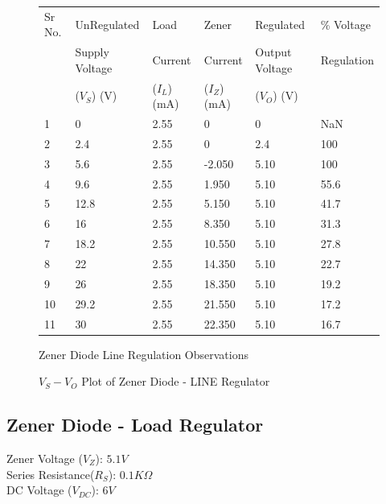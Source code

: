 			\begin{figure}[h!]
				\begin{longtable}[]{@{}llllll@{}}
					\toprule
					Sr No. & UnRegulated & Load & Zener & Regulated & \% Voltage\tabularnewline
					& Supply Voltage & Current & Current & Output Voltage & Regulation\tabularnewline
					& ($V_S$) (V) & ($I_L$) (mA) & ($I_Z$)(mA) & ($V_O$) (V) & \tabularnewline
					\midrule
					\endhead
					1 & 0 & 2.55 & 0 & 0 & NaN\tabularnewline
					2 & 2.4 & 2.55 & 0 & 2.4 & 100\tabularnewline
					3 & 5.6 & 2.55 & -2.050 & 5.10 & 100\tabularnewline
					4 & 9.6 & 2.55 & 1.950 & 5.10 & 55.6\tabularnewline
					5 & 12.8 & 2.55 & 5.150 & 5.10 & 41.7\tabularnewline
					6 & 16 & 2.55 & 8.350 & 5.10 & 31.3\tabularnewline
					7 & 18.2 & 2.55 & 10.550 & 5.10 & 27.8\tabularnewline
					8 & 22 & 2.55 & 14.350 & 5.10 & 22.7\tabularnewline
					9 & 26 & 2.55 & 18.350 & 5.10 & 19.2\tabularnewline
					10 & 29.2 & 2.55 & 21.550 & 5.10 & 17.2\tabularnewline
					11 & 30 & 2.55 & 22.350 & 5.10 & 16.7\tabularnewline
					\bottomrule
				\end{longtable}
				\caption{Zener Diode Line Regulation Observations}
			\end{figure}
			
			\begin{figure}[h]
				\centering
				\caption{$V_S - V_O$ Plot of Zener Diode - LINE Regulator}
			\end{figure}
		
		\newpage
		\subsection{Zener Diode - Load Regulator}
			Zener Voltage ($V_{Z}$): $5.1 V$\\
			Series Resistance($R_{S}$): $0.1 K\Omega$\\
			DC Voltage ($V_{DC}$): $6 V$
			
